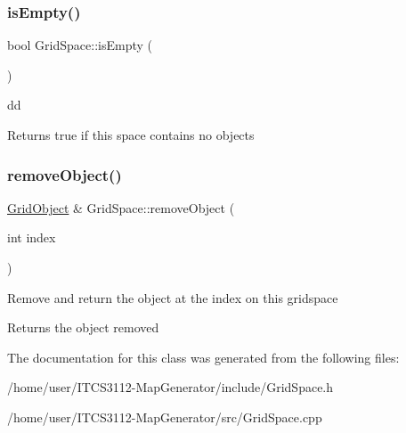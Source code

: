 \subsubsection{\texorpdfstring{is\+Empty()}{isEmpty()}}
{\footnotesize\ttfamily bool Grid\+Space\+::is\+Empty (\begin{DoxyParamCaption}{ }\end{DoxyParamCaption})}

dd \begin{DoxyReturn}{Returns}
true if this space contains no objects 
\end{DoxyReturn}
\mbox{\label{classGridSpace_a594a21f7ad73da6c21ba5a258884b910}} 
\subsubsection{\texorpdfstring{remove\+Object()}{removeObject()}}
{\footnotesize\ttfamily \hyperlink{classGridObject}{Grid\+Object} \& Grid\+Space\+::remove\+Object (\begin{DoxyParamCaption}\item[{int}]{index }\end{DoxyParamCaption})}

Remove and return the object at the index on this gridspace

\begin{DoxyReturn}{Returns}
the object removed 
\end{DoxyReturn}


The documentation for this class was generated from the following files\+:\begin{DoxyCompactItemize}
\item 
/home/user/\+I\+T\+C\+S3112-\/\+Map\+Generator/include/Grid\+Space.\+h\item 
/home/user/\+I\+T\+C\+S3112-\/\+Map\+Generator/src/Grid\+Space.\+cpp\end{DoxyCompactItemize}

